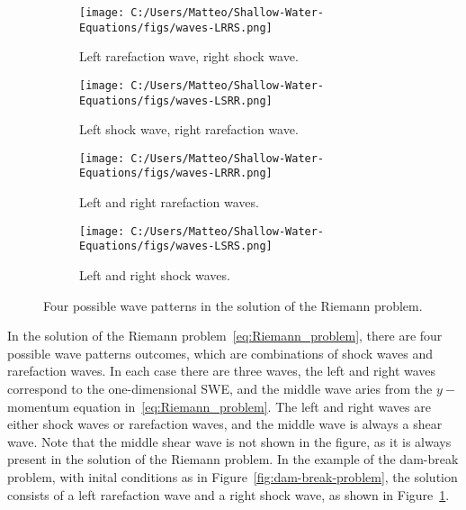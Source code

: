\begin{figure}[htbp]
    \centering
    \begin{subfigure}[b]{0.4\textwidth}
        \centering
        \texttt{[image: C:/Users/Matteo/Shallow-Water-Equations/figs/waves-LRRS.png]}
        \caption{Left rarefaction wave, right shock wave.}\label{fig:waves-LRRS}
    \end{subfigure}
    \hspace{0.02\textwidth} %
    \begin{subfigure}[b]{0.4\textwidth}
        \centering
        \texttt{[image: C:/Users/Matteo/Shallow-Water-Equations/figs/waves-LSRR.png]}
        \caption{Left shock wave, right rarefaction wave.}\label{fig:waves-LSRR}
    \end{subfigure}
    
    \begin{subfigure}[b]{0.4\textwidth}
        \centering
        \texttt{[image: C:/Users/Matteo/Shallow-Water-Equations/figs/waves-LRRR.png]}
        \caption{Left and right rarefaction waves.}\label{fig:waves-LRRR}
    \end{subfigure}
    \hspace{0.02\textwidth} %
    \begin{subfigure}[b]{0.4\textwidth}
        \centering
        \texttt{[image: C:/Users/Matteo/Shallow-Water-Equations/figs/waves-LSRS.png]}
        \caption{Left and right shock waves.}\label{fig:waves-LSRS}
    \end{subfigure}
    \caption{Four possible wave patterns in the solution of the Riemann problem.}\label{fig:wave-patterns}
\end{figure}
In the solution of the Riemann problem~\eqref{eq:Riemann_problem}, there are four possible wave patterns outcomes, which are combinations of shock waves and rarefaction waves.
In each case there are three waves, the left and right waves correspond to the one-dimensional SWE, and the middle wave aries from the $y-$momentum equation in~\eqref{eq:Riemann_problem}.
The left and right waves are either shock waves or rarefaction waves, and the middle wave is always a shear wave.
Note that the middle shear wave is not shown in the figure, as it is always present in the solution of the Riemann problem.
In the example of the dam-break problem, with inital conditions as in Figure~\ref{fig:dam-break-problem}, the solution consists of a left rarefaction wave and a right shock wave, as shown in Figure~\ref{fig:waves-LRRS}.


